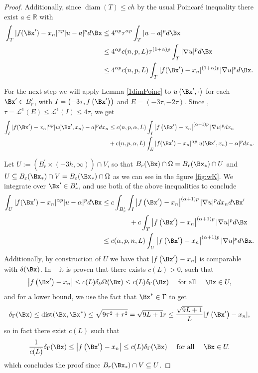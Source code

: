 \begin{proof}
Additionally, since  $\operatorname{diam}(T)\leq c h$  by the usual Poincaré inequality there exist $a \in \mathbb{R}$ with
\begin{align*}
\int_T|f(\Bx')-x_n|^{\alpha p}|u-a|^p d \Bx &\leq 4^{\Ga p} \tau^{\Ga p}\int_T|u-a|^p d\Bx\\
&\leq 4^{\alpha p} c(n,p,L) \tau^{(1+\alpha)p} \int_T|\nabla u|^p d \Bx\\
&\leq 4^{\alpha p} c(n,p,L) \int_T|f(\Bx')-x_n|^{(1+\alpha) p}|\nabla u|^p d \Bx.
\end{align*}

 For the next step we will apply Lemma \ref{1dimPoinc} to $u\left(\Bx^{\prime}, \cdot\right)$ for each $\Bx^{\prime} \in B_r^{\prime}$, with $I=\left(-3 \tau, f\left(\Bx^{\prime}\right)\right)$ and $E=(-3 \tau,-2 \tau)$. Since , $\tau=\mathcal{L}^1(E) \leq \mathcal{L}^1(I) \leq 4 \tau$, we get 
 \begin{align*}
\int_I|f(\Bx')-x_n|^{\alpha p}|u(\Bx',x_n)-a|^p d x_n &\leq c(n,p,\alpha,L)\int_I\left|f\left(\Bx^{\prime}\right)-x_n\right|^{(\alpha+1)p}|\nabla u|^p d x_n\\
&+c(n,p,\alpha,L) \int_E|f(\Bx')-x_n|^{\alpha p}|u(\Bx',x_n)-\alpha|^p d x_n.
\end{align*}

Let $U:=\left(B_r^{\prime} \times(-3 h, \infty)\right) \cap V$, so that $B_r(\Bx) \cap \Omega=B_r(\Bx_*) \cap U$ and $U \subseteq B_{\varepsilon}(\Bx_*) \cap V=B_{\varepsilon}(\Bx_*) \cap \Omega$ as we can see in the figure \ref{fig:wK}. We integrate over $\Bx^{\prime} \in B_r^{\prime}$, and use both of the above inequalities to conclude
$$
\begin{aligned}
\int_U|f(\Bx')-x_n|^{\alpha p}|u-\alpha|^p d \Bx & \leq c \int_{B_r^{\prime}} \int_I\left|f\left(\Bx^{\prime}\right)-x_n\right|^{(\alpha+1)p}|\nabla u|^p d x_n d \Bx^{\prime}\\
&\qquad \qquad + c \int_T\left|f\left(\Bx^{\prime}\right)-x_n\right|^{(\alpha+1)p}|\nabla u|^p d \Bx \\
& \leq c(\Ga,p,n,L) \int_U\left|f\left(\Bx^{\prime}\right)-x_n\right|^{(\alpha+1)p}|\nabla u|^p d \Bx.
\end{aligned}
$$
Additionally, by construction of $U$ we have that $|f\left(\Bx^{\prime}\right)-x_n|$ is comparable with $\delta(\Bx)$. In ~\cite[Lemma5.7]{conti0} it is proven that there exists $c(L)>0$, such that
$$
\left|f\left(\Bx^{\prime}\right)-x_n\right| \leq c(L) \delta_\dOm(\Bx)\leq c(L)\delta_\GG(\Bx) \quad \text { for all }\quad \Bx \in U ,
$$
and for a lower bound, we use the fact that $\Bx^*\in \GG$ to get
\begin{align*}
    \Gd_\Gamma(\Bx)\leq \dist(\Bx,\Bx^*)
    \leq\sqrt{9\tau^2+r^2}
    =\sqrt{9L+1}r
    \leq \frac{\sqrt{9L+1}}{L} |f\left(\Bx^{\prime}\right)-x_n|,
\end{align*}
so in fact there exist $c(L)$ such that
$$\frac{1}{c(L)} \delta_\GG(\Bx)\leq \left|f\left(\Bx^{\prime}\right)-x_n\right| \leq c(L) \delta_\GG(\Bx) \quad \text { for all }\quad \Bx \in U .$$
which concludes the proof since $B_r(\Bx_*) \cap V \subseteq U$.
\end{proof}

